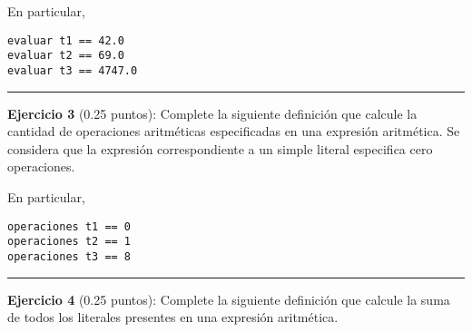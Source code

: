 En particular,

\begin{verbatim}
evaluar t1 == 42.0
evaluar t2 == 69.0
evaluar t3 == 4747.0
\end{verbatim}

\begin{center}\rule{3in}{0.4pt}\end{center}

\textbf{Ejercicio 3} (0.25 puntos): Complete la siguiente definición que
calcule la cantidad de operaciones aritméticas especificadas en una
expresión aritmética. Se considera que la expresión correspondiente a un
simple literal especifica cero operaciones.

\begin{Shaded}
\begin{Highlighting}[]
\OtherTok{->} 
  \FunctionTok{=}  
              \OtherTok{->} 
             \OtherTok{->}  \FunctionTok{+} 
                 \OtherTok{->}  \FunctionTok{+} \FunctionTok{+} 
                \OtherTok{->}  \FunctionTok{+} \FunctionTok{+} 
      \OtherTok{->}  \FunctionTok{+} \FunctionTok{+} 
      \OtherTok{->}  \FunctionTok{+} \FunctionTok{+} 
\end{Highlighting}
\end{Shaded}

En particular,

\begin{verbatim}
operaciones t1 == 0
operaciones t2 == 1
operaciones t3 == 8
\end{verbatim}

\begin{center}\rule{3in}{0.4pt}\end{center}

\textbf{Ejercicio 4} (0.25 puntos): Complete la siguiente definición que
calcule la suma de todos los literales presentes en una expresión
aritmética.

